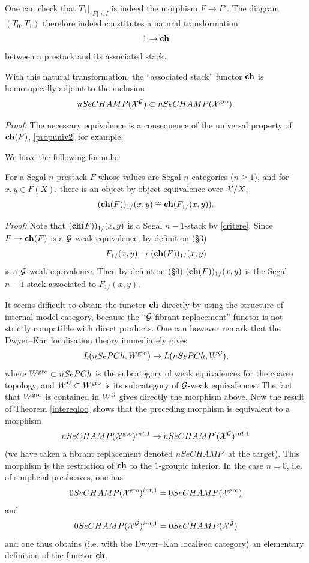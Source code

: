 One can check that $T_1|_{\{ F\} \times I}$ is indeed
the morphism $F\rightarrow F'$.
The diagram $(T_0,T_1)$ therefore indeed constitutes a natural transformation
$$
1\rightarrow {\bf ch}
$$
between a prestack and its associated stack.

\begin{theorem}
\label{cestadjoint}
With this natural transformation, the ``associated stack'' functor
${\bf ch}$ is homotopically adjoint to the inclusion
$$
nSeCHAMP({\cal X} ^{{\cal G}})\subset nSeCHAMP({\cal X} ^{\rm gro}).
$$
\end{theorem}
{\em Proof:}
The necessary equivalence is a consequence of the universal property
of ${\bf ch}(F)$, \ref{propuniv2} for example.
\eop


We have the following formula:

\begin{lemma}
\label{formule}
For a Segal $n$-prestack $F$ whose
values are Segal $n$-categories ($n\geq 1$), and for $x,y\in F(X)$,
there is an object-by-object equivalence over ${\cal X} /X$,
$$
({\bf ch}(F))_{1/}(x,y) \cong {\bf ch}(F_{1/}(x,y)).
$$
\end{lemma}
{\em Proof:}
Note that
$({\bf ch}(F))_{1/}(x,y)$ is a Segal $n-1$-stack by \ref{critere}.
Since $F\rightarrow {\bf ch}(F)$ is a ${\cal G}$-weak equivalence, by
definition (\S3)
$$
F_{1/}(x,y)\rightarrow ({\bf ch}(F))_{1/}(x,y)
$$
is a ${\cal G}$-weak equivalence. Then by definition (\S9)
$({\bf ch}(F))_{1/}(x,y)$ is the Segal $n-1$-stack associated to
$F_{1/}(x,y)$.
\eop



It seems difficult to obtain the functor ${\bf ch}$ directly by using the
structure of internal model category, because the ``${\cal G}$-fibrant
replacement'' functor is not strictly compatible with direct products.
One can however remark that the Dwyer--Kan localisation theory
immediately gives
$$
L(nSePCh , W^{\rm gro}) \rightarrow L(nSePCh, W^{{\cal G}}),
$$
where $W^{\rm gro}\subset nSePCh$ is the subcategory
of weak equivalences for the coarse topology, and
$W^{{\cal G}}\subset W^{\rm gro}$ is its subcategory of ${\cal G}$-weak
equivalences.
The fact that $W^{\rm gro}$ is contained in $W^{{\cal G}}$ gives directly the
morphism above.
Now the result of Theorem
\ref{intereqloc}
shows that the preceding morphism is equivalent to a morphism
$$
nSeCHAMP({\cal X} ^{\rm gro})^{int, 1}\rightarrow
nSeCHAMP'({\cal X} ^{{\cal G}})^{int, 1}
$$
(we have taken a fibrant replacement denoted $nSeCHAMP'$ at the target).
This morphism is the restriction of ${\bf ch}$ to the $1$-groupic interior.
In the case $n=0$, i.e. of simplicial presheaves, one has
$$
0SeCHAMP({\cal X} ^{\rm gro})^{int, 1}=0SeCHAMP({\cal X} ^{\rm gro})
$$
and
$$
0SeCHAMP({\cal X} ^{{\cal G}})^{int, 1}=0SeCHAMP({\cal X} ^{{\cal G}})
$$
and one thus obtains (i.e. with the Dwyer--Kan localised category) an elementary
definition of the functor ${\bf ch}$.
